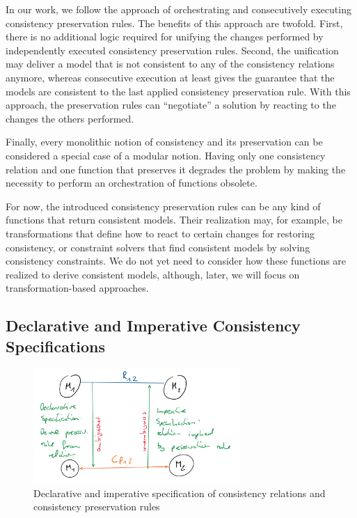 In our work, we follow the approach of orchestrating and consecutively executing \glspl{consistency preservation rule}.
The benefits of this approach are twofold. First, there is no additional logic required for unifying the changes performed by independently executed \glspl{consistency preservation rule}. 
Second, the unification may deliver a model that is not consistent to any of the \glspl{consistency relation} anymore, whereas consecutive execution at least gives the guarantee that the models are consistent to the last applied \gls{consistency preservation rule}.
With this approach, the preservation rules can \enquote{negotiate} a solution by reacting to the changes the others performed.

\begin{remark} 
Finally, every monolithic notion of consistency and its preservation can be considered a special case of a modular notion. Having only one consistency relation and one function that preserves it degrades the problem by making the necessity to perform an orchestration of functions obsolete.
\end{remark}

For now, the introduced \glspl{consistency preservation rule} can be any kind of functions that return consistent models. 
Their realization may, for example, be transformations that define how to react to certain changes for restoring consistency, or constraint solvers that find consistent models by solving consistency constraints. 
We do not yet need to consider how these functions are realized to derive consistent models, although, later, we will focus on transformation-based approaches.


\subsection{Declarative and Imperative Consistency Specifications}

\begin{figure}
    \centering
    \includegraphics[width=0.7\textwidth]{figures/correctness/notion/declarative_imperative}
    \caption[Declarative and imperative consistency specification]{Declarative and imperative specification of consistency relations and consistency preservation rules}
    \label{fig:correctness:declarative_imperative}
\end{figure}

